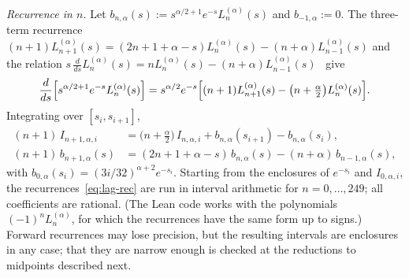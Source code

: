 \documentclass[11pt,reqno]{amsart}
\theoremstyle{definition}
\numberwithin{equation}{section}
\begin{document}
\emph{Recurrence in $n$.} Let $b_{n,\alpha}(s):=s^{\alpha/2+1}e^{-s}L_n^{(\alpha)}(s)$ and $b_{-1,\alpha}:=0$. The three-term recurrence $(n+1)L_{n+1}^{(\alpha)}(s)=(2n+1+\alpha-s)L_n^{(\alpha)}(s)-(n+\alpha)L_{n-1}^{(\alpha)}(s)$ and the relation $s\,\frac{d}{ds}L_n^{(\alpha)}(s)=nL_n^{(\alpha)}(s)-(n+\alpha)L_{n-1}^{(\alpha)}(s)$~\cite[Section~5.1]{Sze75} give
\[
  \frac{d}{ds}\Bigl[s^{\alpha/2+1}e^{-s}L_n^{(\alpha)}(s)\Bigr]=s^{\alpha/2}e^{-s}\Bigl[(n+1)L_{n+1}^{(\alpha)}(s)-\bigl(n+\tfrac\alpha2\bigr)L_n^{(\alpha)}(s)\Bigr].
\]
Integrating over $[s_i,s_{i+1}]$,
\begin{equation}\label{eq:lag-rec}
\begin{aligned}
  (n+1)\,I_{n+1,\alpha,i}&=\bigl(n+\tfrac\alpha2\bigr)\,I_{n,\alpha,i}+b_{n,\alpha}(s_{i+1})-b_{n,\alpha}(s_i),\\
  (n+1)\,b_{n+1,\alpha}(s)&=(2n+1+\alpha-s)\,b_{n,\alpha}(s)-(n+\alpha)\,b_{n-1,\alpha}(s),
\end{aligned}
\end{equation}
with $b_{0,\alpha}(s_i)=(3i/32)^{\alpha+2}e^{-s_i}$. Starting from the enclosures of $e^{-s_i}$ and $I_{0,\alpha,i}$, the recurrences~\eqref{eq:lag-rec} are run in interval arithmetic for $n=0,\dots,249$; all coefficients are rational. (The Lean code works with the polynomials $(-1)^nL_n^{(\alpha)}$, for which the recurrences have the same form up to signs.) Forward recurrences may lose precision, but the resulting intervals are enclosures in any case; that they are narrow enough is checked at the reductions to midpoints described next.
\end{document}

